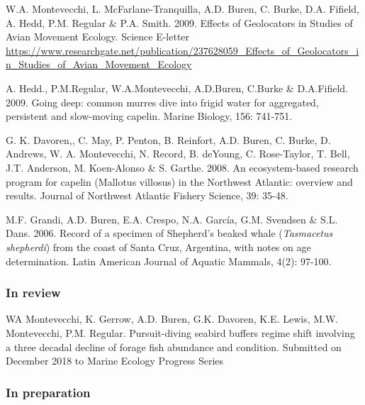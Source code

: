 \documentclass{res}
\begin{document}
\begin{resume}
\begin{hangparas}{.4in}{1}
W.A. Montevecchi, L. McFarlane-Tranquilla, A.D. Buren, C. Burke, D.A. Fifield, A. Hedd, P.M. Regular \& P.A. Smith. 2009. Effects of Geolocators in Studies of Avian Movement Ecology. Science E-letter \url{https://www.researchgate.net/publication/237628059_Effects_of_Geolocators_in_Studies_of_Avian_Movement_Ecology}

A. Hedd., P.M.Regular, W.A.Montevecchi, A.D.Buren, C.Burke \& D.A.Fifield. 2009. Going deep: common murres dive into frigid water for aggregated, persistent and slow-moving capelin. Marine Biology, 156: 741-751.

G. K. Davoren,, C. May, P. Penton, B. Reinfort, A.D. Buren, C. Burke, D. Andrews, W. A. Montevecchi, N. Record, B. deYoung, C. Rose-Taylor, T. Bell, J.T. Anderson, M. Koen-Alonso \& S. Garthe. 2008. An ecosystem-based research program for capelin (Mallotus villosus) in the Northwest Atlantic: overview and results. Journal of Northwest Atlantic Fishery Science, 39: 35-48.

M.F. Grandi, A.D. Buren, E.A. Crespo, N.A. García, G.M. Svendsen \& S.L. Dans. 2006. Record of a specimen of Shepherd’s beaked whale (\textit{Tasmacetus shepherdi}) from the coast of Santa Cruz, Argentina, with notes on age determination. Latin American Journal of Aquatic Mammals, 4(2): 97-100.
 

\end{hangparas}

\subsubsection{In review}
\begin{hangparas}{.4in}{1}


WA Montevecchi, K. Gerrow, A.D. Buren, G.K. Davoren, K.E. Lewis, M.W. Montevecchi, P.M. Regular. Pursuit-diving seabird buffers regime shift involving a three decadal decline of forage fish abundance and condition. Submitted on December 2018 to Marine Ecology Progress Series

\end{hangparas}
\subsubsection{In preparation}
\begin{hangparas}{.4in}{1}


\end{hangparas}
\end{resume}
\end{document}
